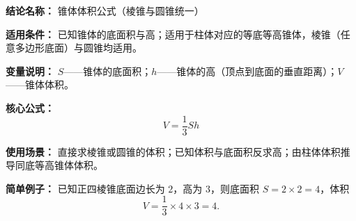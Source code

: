 \textbf{结论名称：} 锥体体积公式（棱锥与圆锥统一）

\textbf{适用条件：} 已知锥体的底面积与高；适用于柱体对应的等底等高锥体，棱锥（任意多边形底面）与圆锥均适用。

\textbf{变量说明：} \(S\)——锥体的底面积；\(h\)——锥体的高（顶点到底面的垂直距离）；\(V\)——锥体体积。

\textbf{核心公式：} 
\[
\boxed{V = \frac{1}{3}Sh}
\]

\textbf{使用场景：} 直接求棱锥或圆锥的体积；已知体积与底面积反求高；由柱体体积推导同底等高锥体体积。

\textbf{简单例子：} 已知正四棱锥底面边长为 \(2\)，高为 \(3\)，则底面积 \(S=2\times2=4\)，体积 
\[
V = \frac{1}{3}\times 4\times 3 = 4 .
\]